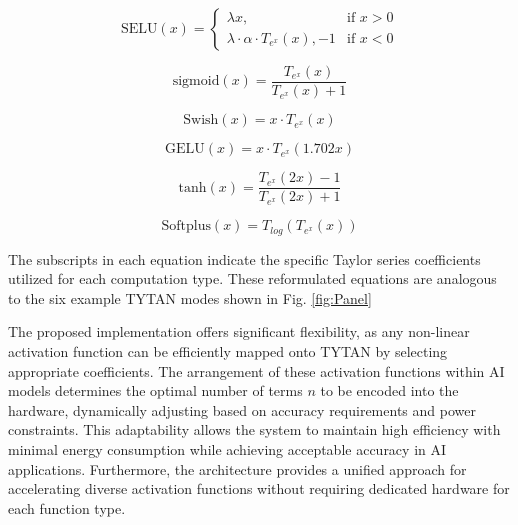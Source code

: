 \documentclass[runningheads]{llncs}
\begin{document}
    \begin{equation}
        \text{SELU}(x) =
        \begin{cases} 
            \lambda x, & \text{if } x > 0 \\
            \lambda \cdot \alpha \cdot T_{e^x}(x),-1 & \text{if } x < 0
        \end{cases}
        \label{eq:4}
    \end{equation}
    
    \begin{equation} 
       \text{sigmoid}(x) = \frac{T_{e^x}(x)}{T_{e^x}(x) + 1}
       \label{eq:5}
    \end{equation}
    
    \begin{equation}
        \text{Swish}(x) = x \cdot T_{e^x}(x)
        \label{eq:6}
    \end{equation}
    
    \begin{equation}
        \text{GELU}(x) = x \cdot T_{e^x}(1.702x)
        \label{eq:7}
    \end{equation}
    
    \begin{equation}
        \text{tanh}(x) = \frac{T_{e^x}(2x) - 1}{T_{e^x}(2x) + 1}
        \label{eq:8}
    \end{equation}
    
    \begin{equation}
        \text{Softplus}(x) = T_{log}(T_{e^x}(x))
        \label{eq:9}
    \end{equation}
    
    The subscripts in each equation indicate the specific Taylor series coefficients utilized for each computation type. These reformulated equations are analogous to the six example TYTAN modes shown in Fig. \ref{fig:Panel}
    
    The proposed implementation offers significant flexibility, as any non-linear activation function can be efficiently mapped onto TYTAN by selecting appropriate coefficients. The arrangement of these activation functions within AI models determines the optimal number of terms $n$ to be encoded into the hardware, dynamically adjusting based on accuracy requirements and power constraints. This adaptability allows the system to maintain high efficiency with minimal energy consumption while achieving acceptable accuracy in AI applications. Furthermore, the architecture provides a unified approach for accelerating diverse activation functions without requiring dedicated hardware for each function type.
\end{document}
